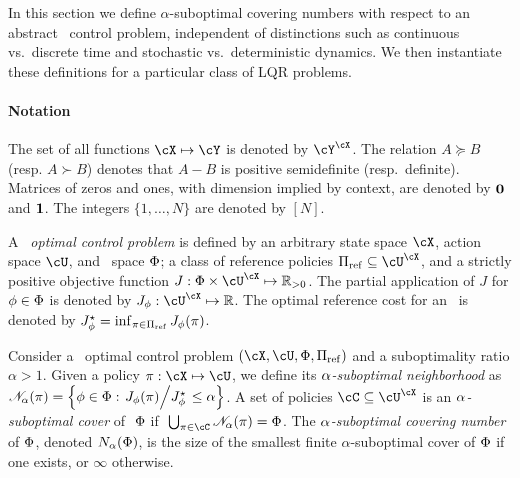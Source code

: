 In this section we define $\alpha$-suboptimal covering numbers
with respect to an abstract \multienv\ control problem,
independent of distinctions
such as continuous vs.\ discrete time and stochastic vs.\ deterministic dynamics.
We then instantiate these definitions for a particular class of LQR problems.

\paragraph{Notation}
The set of all functions $\cX \mapsto \cY$ is denoted by $\cY^\cX$.
The relation $A \succeq B$ (resp. ${A \succ B}$) denotes that $A - B$ is positive semidefinite (resp.\ definite).
Matrices of zeros and ones, with dimension implied by context, are denoted by $\mathbf{0}$ and $\mathbf{1}$.
The integers $\{1, \dots, N\}$ are denoted by $[N]$.




\begin{definition}%
	A \emph{\multienv\ optimal control problem} is defined by
	an arbitrary state space $\cX$,
	action space $\cU$,
	and \envword\ space $\Phi$;
	a class of reference policies $\Refpolicies \subseteq \cU^\cX$,
	and a strictly positive objective function $J : \Envs \times \cU^\cX \mapsto \R_{> 0}$.
	The partial application of $J$ for $\phi \in \Phi$
	is denoted by $J_\env : \cU^\cX \mapsto \R$.
	The optimal reference cost for an \envword\ is denoted by
	$J^\star_\phi = \inf_{\pi \in \Pi_{\mathrm{ref}}} J_\phi(\pi)$.
\end{definition}



\begin{definition}%
\label{def:suboptimal-neighborhood}
	Consider a \multienv\ optimal control problem $(\cX, \cU, \Envs, \Refpolicies)$
	and a suboptimality ratio $\alpha > 1$.
	Given a policy $\pi : \cX \mapsto \cU$,
	we define its \emph{$\alpha$-suboptimal neighborhood} as
	\(
		\mathscr{N}_{\alpha}(\pi) = \left\{
			\phi \in \Phi :
			\left. J_\phi(\pi) \middle/ J^\star_\phi \right.
			\leq \alpha
		\right\}
	\).
	A set of policies $\coveringset \subseteq \cU^\cX$
	is an \emph{$\alpha$-suboptimal cover} of $\ \Phi$
	if
	\(
		\ \bigcup_{\pi \in \coveringset} \suboptneighb{\subopt}{\pi}
		= \Envs
	\).
	The \emph{$\alpha$-suboptimal covering number} of $\Phi$,
	denoted $N_{\alpha}(\Phi)$,
	is the size of the smallest finite $\alpha$-suboptimal cover of $\Phi$ if one exists,
	or $\infty$ otherwise.
\end{definition}


